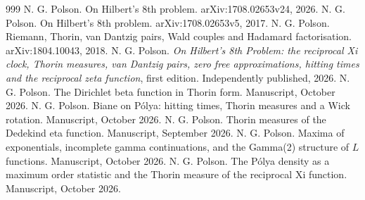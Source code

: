 \begin{thebibliography}{999}
 N. G. Polson. On Hilbert's 8th problem. arXiv:1708.02653v24, 2026.
 N. G. Polson. On Hilbert's 8th problem. arXiv:1708.02653v5, 2017.
 N. G. Polson. Riemann, Thorin, van Dantzig pairs, Wald couples and Hadamard factorisation. arXiv:1804.10043, 2018.
 N. G. Polson. \emph{On Hilbert's 8th Problem: the reciprocal Xi clock, Thorin measures, van Dantzig pairs, zero free approximations, hitting times and the reciprocal zeta function}, first edition. Independently published, 2026.
 N. G. Polson. The Dirichlet beta function in Thorin form. Manuscript, October 2026.
 N. G. Polson. Biane on P\'olya: hitting times, Thorin measures and a Wick rotation. Manuscript, October 2026.
 N. G. Polson. Thorin measures of the Dedekind eta function. Manuscript, September 2026.
 N. G. Polson. Maxima of exponentials, incomplete gamma continuations, and the Gamma(2) structure of $L$ functions. Manuscript, October 2026.
 N. G. Polson. The P\'olya density as a maximum order statistic and the Thorin measure of the reciprocal Xi function. Manuscript, October 2026.

\end{thebibliography}
